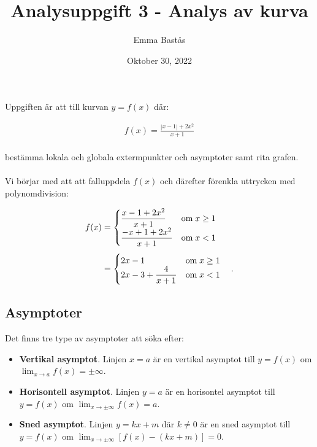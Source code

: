 \documentclass{article}
\title{Analysuppgift 3 - Analys av kurva}
\author{Emma Bastås}
\date{Oktober 30, 2022}
\begin{document}
\maketitle

\noindent Uppgiften är att till kurvan $y = f(x)$ där:

\begin{gather*}
  f(x) = \frac{|x-1| + 2x^{2}}{x + 1}
\end{gather*}
\\
bestämma lokala och globala extermpunkter och asymptoter samt rita grafen.
\\
\\
Vi börjar med att att falluppdela $f(x)$ och därefter förenkla uttrycken med polynomdivision:

\begin{align}
  f(x) &=
         \begin{cases}
           \begin{aligned}[t]
             & \frac{x - 1 + 2x^{2}}{x+1} & \text{om} \; x \geq 1 \\
             & \frac{-x + 1 +2x^{2}}{x+1} & \text{om} \; x < 1
           \end{aligned}
         \end{cases} \notag \\[4pt]
       & =
         \begin{cases}
           \begin{aligned}[t]
             & 2x - 1 & \text{om} \; x \geq 1 \\
             & 2x - 3 + \frac{4}{x + 1} & \text{om} \; x < 1
          \end{aligned}
         \end{cases}\text{.} \label{cases}
\end{align}


\subsection*{Asymptoter}

Det finns tre type av asymptoter att söka efter:

\begin{itemize}
        \item \textbf{Vertikal asymptot}. Linjen $x = a$ är en vertikal asymptot till $y = f(x)$ om $\lim_{x \to a}f(x) = \pm\infty$.
        \item \textbf{Horisontell asymptot}. Linjen $y = a$ är en horisontel asymptot till $y = f(x)$ om $\lim_{x \to \pm\infty}f(x) = a$.
        \item \textbf{Sned asymptot}. Linjen $y = kx + m$ där $k \neq 0$ är en sned asymptot till $y = f(x)$ om $\lim_{x \to \pm\infty}[f(x) - (kx +m)] = 0$.
\end{itemize}
\end{document}

